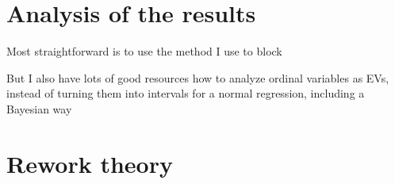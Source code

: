 \section*{Analysis of the results}
	\begin{coi}
		\item Most straightforward is to use the method I use to block
		\item But I also have lots of good resources how to analyze ordinal variables as EVs, instead of turning them into intervals for a normal regression, including a Bayesian way
	\end{coi}



\section*{Rework theory}
